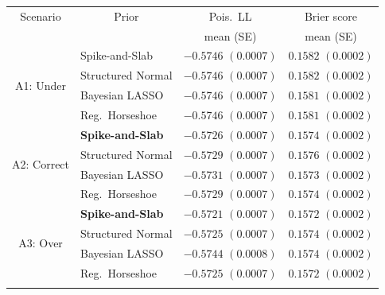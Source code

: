 \begin{tabular}{clcc}
\toprule
\multicolumn{1}{c}{Scenario} & \multicolumn{1}{c}{Prior} 
    & Pois.\ LL & Brier score \\
 & & \multicolumn{1}{c}{mean (SE)} & \multicolumn{1}{c}{mean (SE)} \\
\midrule
\multirow{4}{*}{A1: Under}
  & Spike-and-Slab       & $-0.5746$ $(0.0007)$ & $0.1582$ $(0.0002)$ \\
  & Structured Normal    & $-0.5746$ $(0.0007)$ & $0.1582$ $(0.0002)$ \\
  & Bayesian LASSO       & $-0.5746$ $(0.0007)$ & $0.1581$ $(0.0002)$ \\
  & Reg.\ Horseshoe      & $-0.5746$ $(0.0007)$ & $0.1581$ $(0.0002)$ \\
\midrule
\multirow{4}{*}{A2: Correct}
  & \textbf{Spike-and-Slab}    & $\mathbf{-0.5726}$ $(0.0007)$ & $0.1574$ $(0.0002)$ \\
  & Structured Normal          & $-0.5729$ $(0.0007)$ & $0.1576$ $(0.0002)$ \\
  & Bayesian LASSO             & $-0.5731$ $(0.0007)$ & $\mathbf{0.1573}$ $(0.0002)$ \\
  & Reg.\ Horseshoe            & $-0.5729$ $(0.0007)$ & $0.1574$ $(0.0002)$ \\
\midrule
\multirow{4}{*}{A3: Over}
  & \textbf{Spike-and-Slab}    & $\mathbf{-0.5721}$ $(0.0007)$ & $\mathbf{0.1572}$ $(0.0002)$ \\
  & Structured Normal          & $-0.5725$ $(0.0007)$ & $0.1574$ $(0.0002)$ \\
  & Bayesian LASSO             & $-0.5744$ $(0.0008)$ & $0.1574$ $(0.0002)$ \\
  & Reg.\ Horseshoe            & $-0.5725$ $(0.0007)$ & $\mathbf{0.1572}$ $(0.0002)$ \\
\bottomrule
\multicolumn{4}{l}{}
\end{tabular}
